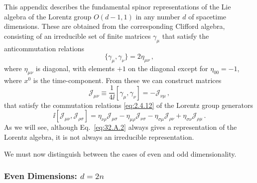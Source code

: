 

This appendix describes the fundamental spinor representations of the Lie
algebra of the Lorentz group \(O(d-1,1)\) in any number \(d\) of spacetime
dimensions. These are obtained from the corresponding Clifford algebra,
consisting of an irreducible set of finite matrices \(\gamma_\mu\) that
satisfy the anticommutation relations
\begin{equation}
  \{\gamma_\mu,\gamma_\nu\}=2\eta_{\mu\nu}\,,
  \tag{32.A.1}\label{eq:32.A.1}
\end{equation}
where \(\eta_{\mu\nu}\) is diagonal, with elements \(+1\) on the diagonal
except for \(\eta_{00}=-1\), where \(x^0\) is the time-component. From these
we can construct matrices
\begin{equation}
  \mathcal J_{\mu\nu}
  \equiv\frac{1}{4\ii}[\gamma_\mu,\gamma_\nu]
  =-\mathcal J_{\nu\mu}\,,
  \tag{32.A.2}\label{eq:32.A.2}
\end{equation}
that satisfy the commutation relations \eqref{eq:2.4.12} of the Lorentz
group generators
\begin{equation}
  \ii[\mathcal J_{\mu\nu},\mathcal J_{\rho\sigma}]
  =\eta_{\nu\rho}\mathcal J_{\mu\sigma}
   -\eta_{\mu\rho}\mathcal J_{\nu\sigma}
   -\eta_{\sigma\mu}\mathcal J_{\rho\nu}
   +\eta_{\sigma\nu}\mathcal J_{\rho\mu}\,.
  \tag{32.A.3}\label{eq:32.A.3}
\end{equation}
As we will see, although Eq.~\eqref{eq:32.A.2} always gives a representation
of the Lorentz algebra, it is not always an irreducible representation.

We must now distinguish between the cases of even and odd dimensionality.

\subsubsection*{Even Dimensions: \(d=2n\)}

